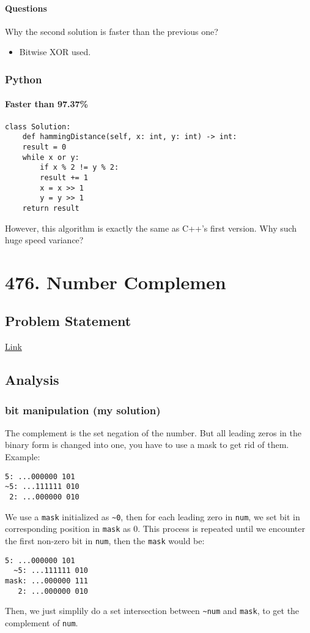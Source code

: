 \documentclass[11pt]{article}
\begin{document}
\paragraph{Questions}
\label{sec:org80ebabf}
Why the second solution is faster than the previous one?
\begin{itemize}
\item Bitwise XOR used.
\end{itemize}
\subsubsection{Python}
\label{sec:orgef6512a}
\paragraph{Faster than 97.37\%}
\label{sec:org732104c}
\begin{verbatim}
class Solution:
    def hammingDistance(self, x: int, y: int) -> int:
	result = 0
	while x or y:
	    if x % 2 != y % 2:
		result += 1
	    x = x >> 1
	    y = y >> 1
	return result
\end{verbatim}
However, this algorithm is exactly the same as C++'s first version. Why such huge speed variance?
\section{476. Number Complemen}
\label{sec:org6411a23}
\subsection{Problem Statement}
\label{sec:org5fd183a}
\href{https://leetcode.com/problems/number-complement/}{Link}
\subsection{Analysis}
\label{sec:orge0b1df9}
\subsubsection{bit manipulation (my solution)}
\label{sec:org1bdb1e8}
The complement is the set negation of the number. But all leading zeros in the binary form is changed into one, you have to use a mask to get rid of them. Example:
\begin{Verbatim}[frame=single]
 5: ...000000 101
~5: ...111111 010
 2: ...000000 010
\end{Verbatim}
We use a \texttt{mask} initialized as \texttt{\textasciitilde{}0}, then for each leading zero in \texttt{num}, we set bit in corresponding position in \texttt{mask} as 0. This process is repeated until we encounter the first non-zero bit in \texttt{num}, then the \texttt{mask} would be:
\begin{Verbatim}[frame=single]
   5: ...000000 101
  ~5: ...111111 010
mask: ...000000 111
   2: ...000000 010
\end{Verbatim}
Then, we just simplily do a set intersection between \texttt{\textasciitilde{}num} and \texttt{mask}, to get the complement of \texttt{num}.
\end{document}
